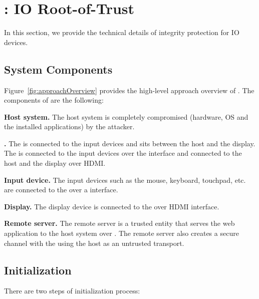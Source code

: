 \section{\name: IO Root-of-Trust}
\label{sec:systemDesign}


In this section, we provide the technical details of \name integrity protection for IO devices.  

\subsection{System Components}
\label{sec:systemDesign:components}

Figure~\ref{fig:approachOverview} provides the high-level approach overview of \name. The components of \name are the following:

\begin{mylist}
  \item \textbf{Host system.} The host system is completely compromised (hardware, OS and the installed applications) by the attacker.
  \item \textbf{\device.} The \device is connected to the input devices and sits between the host and the display. The \device is connected to the input devices over the \usb interface and connected to the host and the display over HDMI.
  \item \textbf{Input device.} The input devices such as the mouse, keyboard, touchpad, etc. are connected to the \device over a \usb interface.
  \item \textbf{Display.} The display device is connected to the \device over HDMI interface.
  \item \textbf{Remote server.} The remote server is a trusted entity that serves the web application to the host system over \http. The remote server also creates a secure channel with the \device using the host as an untrusted transport. 
  
\end{mylist}

\iffalse
\subsection{Initialization} 
\label{sec:systemDesign:init}

There are two steps of initialization process: 

